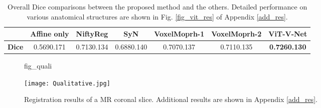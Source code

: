 \documentclass{midl}
\begin{document}
\begin{table}[h]
\vspace{-1mm}
\centering
\scriptsize
    \begin{tabular}{ c | c c c c c c}
 \hline
 & Affine only & NiftyReg & SyN & VoxelMoprh-1 & VoxelMoprh-2 & ViT-V-Net\\
 \hline
 \textbf{Dice} & 0.5690.171 & 0.7130.134 & 0.6880.140 & 0.7070.137 & 0.7110.135 & \textbf{0.7260.130}\\
 
 \hline
\end{tabular}
\captionsetup{justification=centering}
\caption{Overall Dice comparisons between the proposed method and the others. Detailed performance on various anatomical structures are shown in Fig. \ref{fig_vit_res} of Appendix \ref{add_res}.}\label{table_r}
\end{table}
\vspace{-8mm}

\begin{figure}[t]
\floatconts
{fig_quali}
  {\caption{Registration results of a MR coronal slice. Additional results are shown in Appendix \ref{add_res}.}}
  {\texttt{[image: Qualitative.jpg]}\vspace{-4mm}}
\vspace{-4mm}
\end{figure}
\end{document}
